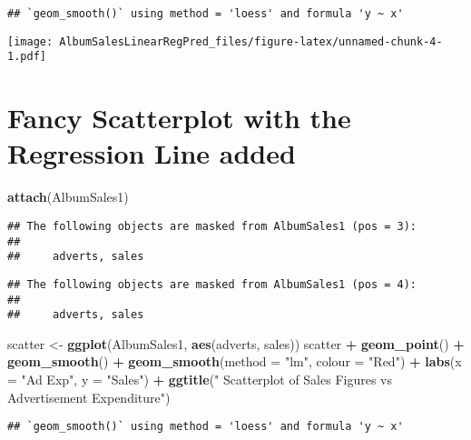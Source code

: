 \documentclass[]{article}
\newenvironment{Shaded}{\begin{snugshade}}{\end{snugshade}}
\newcommand{\KeywordTok}[1]{\textcolor[rgb]{0.13,0.29,0.53}{\textbf{#1}}}
\newcommand{\DataTypeTok}[1]{\textcolor[rgb]{0.13,0.29,0.53}{#1}}
\newcommand{\StringTok}[1]{\textcolor[rgb]{0.31,0.60,0.02}{#1}}
\newcommand{\OperatorTok}[1]{\textcolor[rgb]{0.81,0.36,0.00}{\textbf{#1}}}
\newcommand{\NormalTok}[1]{#1}
\begin{document}
\begin{verbatim}
## `geom_smooth()` using method = 'loess' and formula 'y ~ x'
\end{verbatim}

\texttt{[image: AlbumSalesLinearRegPred\_files/figure-latex/unnamed-chunk-4-1.pdf]}

\section{Fancy Scatterplot with the Regression Line
added}\label{fancy-scatterplot-with-the-regression-line-added}

\begin{Shaded}
\begin{Highlighting}[]
\KeywordTok{attach}\NormalTok{(AlbumSales1)}
\end{Highlighting}
\end{Shaded}

\begin{verbatim}
## The following objects are masked from AlbumSales1 (pos = 3):
## 
##     adverts, sales
\end{verbatim}

\begin{verbatim}
## The following objects are masked from AlbumSales1 (pos = 4):
## 
##     adverts, sales
\end{verbatim}

\begin{Shaded}
\begin{Highlighting}[]
\NormalTok{scatter <-}\StringTok{ }\KeywordTok{ggplot}\NormalTok{(AlbumSales1, }\KeywordTok{aes}\NormalTok{(adverts, sales))}
\NormalTok{scatter }\OperatorTok{+}\StringTok{ }\KeywordTok{geom_point}\NormalTok{() }\OperatorTok{+}\StringTok{ }
\StringTok{    }\KeywordTok{geom_smooth}\NormalTok{() }\OperatorTok{+}
\StringTok{    }\KeywordTok{geom_smooth}\NormalTok{(}\DataTypeTok{method =} \StringTok{"lm"}\NormalTok{, }\DataTypeTok{colour =} \StringTok{"Red"}\NormalTok{) }\OperatorTok{+}\StringTok{ }
\StringTok{    }\KeywordTok{labs}\NormalTok{(}\DataTypeTok{x =} \StringTok{"Ad Exp"}\NormalTok{, }\DataTypeTok{y =} \StringTok{"Sales"}\NormalTok{) }\OperatorTok{+}\StringTok{ }
\StringTok{    }\KeywordTok{ggtitle}\NormalTok{(}\StringTok{"      Scatterplot of Sales Figures vs Advertisement Expenditure"}\NormalTok{)}
\end{Highlighting}
\end{Shaded}

\begin{verbatim}
## `geom_smooth()` using method = 'loess' and formula 'y ~ x'
\end{verbatim}
\end{document}
